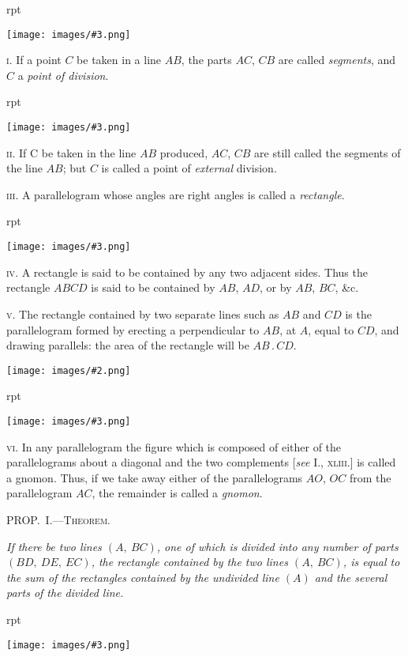 \documentclass[oneside]{book}
\newcounter{wrapwidth}
\newcommand\mypropl[2]{
\bigskip\Needspace*{4\baselineskip}\begin{center}\textsc{#1}\end{center}
\hspace{\parindent}\emph{#2}\par\medskip
}
\newcommand\imgflow[3]{
\setcounter{wrapwidth}{#1}
\begin{wrapfigure}[#2]{r}{\value{wrapwidth}pt}
\begin{center}
\vspace{-0.3in}
\texttt{[image: images/\#3.png]}
\end{center}
\end{wrapfigure}
}
\newcommand\imgcent[2]{
\begin{center}
\texttt{[image: images/\#2.png]}
\end{center}
}
\begin{document}
\imgflow{120}{2}{f072}

\textsc{i}. If a point $C$ be taken in a line $AB$, the parts $AC$,
$CB$ are called \emph{segments}, and $C$ a
\emph{point of division}.

\imgflow{140}{2}{f073}

\textsc{ii}. If C be taken in the line $AB$ produced, $AC$, $CB$ are
still called the segments of
the line $AB$; but $C$ is called
a point of \emph{external} division.

\textsc{iii}. A parallelogram whose angles are right angles is
called a \emph{rectangle}.

\imgflow{135}{8}{f074}

\textsc{iv}. A rectangle is said to
be contained by any two adjacent
sides. Thus the rectangle
$ABCD$ is said to be contained
by $AB$, $AD$, or by $AB$, $BC$,
\&c.

\textsc{v}. The rectangle contained by two separate lines
such as $AB$ and
$CD$ is the parallelogram
formed by erecting a perpendicular to $AB$, at
$A$, equal to $CD$, and drawing parallels: the area of the
rectangle will be $AB\,.\,CD$.

\imgcent{208}{f075}

\imgflow{140}{8}{f076}

\textsc{vi}. In any parallelogram the figure which is composed
of either of the parallelograms
about a diagonal
and the two complements
[\emph{see} I., \textsc{xliii}.] is called a
gnomon. Thus, if we take
away either of the parallelograms
$AO$, $OC$ from the
parallelogram $AC$, the remainder
is called a \emph{gnomon}.


\mypropl{PROP\@.~I.---Theorem.}{If there be two lines $(A,\ BC)$, one of which is divided
into any number of parts $(BD,\ DE,\ EC)$, the rectangle
contained by the two lines $(A,\ BC)$, is equal to the sum of
the rectangles contained by the undivided line $(A)$ and the
several parts of the divided line.}

\imgflow{185}{8}{f077}
\end{document}
